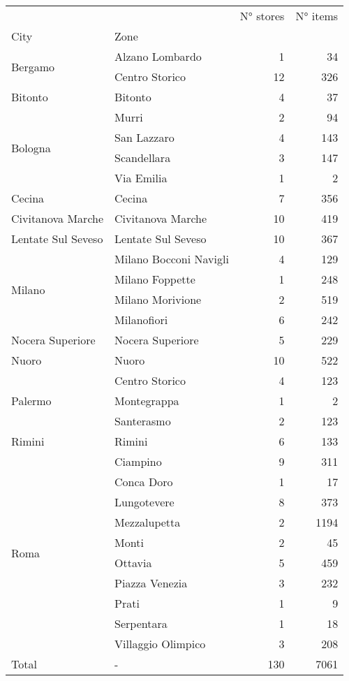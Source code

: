 \begin{tabular}{llrr}
 &  & N° stores & N° items \\
City & Zone &  &  \\
\multirow[c]{2}{*}{Bergamo} & Alzano Lombardo & 1 & 34 \\
 & Centro Storico & 12 & 326 \\
Bitonto & Bitonto & 4 & 37 \\
\multirow[c]{4}{*}{Bologna} & Murri & 2 & 94 \\
 & San Lazzaro & 4 & 143 \\
 & Scandellara & 3 & 147 \\
 & Via Emilia & 1 & 2 \\
Cecina & Cecina & 7 & 356 \\
Civitanova Marche & Civitanova Marche & 10 & 419 \\
Lentate Sul Seveso & Lentate Sul Seveso & 10 & 367 \\
\multirow[c]{4}{*}{Milano} & Milano Bocconi Navigli & 4 & 129 \\
 & Milano Foppette & 1 & 248 \\
 & Milano Morivione & 2 & 519 \\
 & Milanofiori & 6 & 242 \\
Nocera Superiore & Nocera Superiore & 5 & 229 \\
Nuoro & Nuoro & 10 & 522 \\
\multirow[c]{3}{*}{Palermo} & Centro Storico & 4 & 123 \\
 & Montegrappa & 1 & 2 \\
 & Santerasmo & 2 & 123 \\
Rimini & Rimini & 6 & 133 \\
\multirow[c]{10}{*}{Roma} & Ciampino & 9 & 311 \\
 & Conca Doro & 1 & 17 \\
 & Lungotevere & 8 & 373 \\
 & Mezzalupetta & 2 & 1194 \\
 & Monti & 2 & 45 \\
 & Ottavia & 5 & 459 \\
 & Piazza Venezia & 3 & 232 \\
 & Prati & 1 & 9 \\
 & Serpentara & 1 & 18 \\
 & Villaggio Olimpico & 3 & 208 \\
Total & - & 130 & 7061 \\
\end{tabular}
